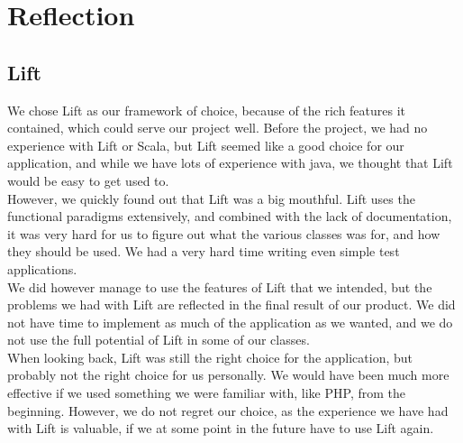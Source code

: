\section{Reflection}
\label{sec:reflection}

\subsection{Lift}
We chose Lift as our framework of choice, because of the rich features it contained, which could serve our project well. Before the project, we had no experience with Lift or Scala, but Lift seemed like a good choice for our application, and while we have lots of experience with java, we thought that Lift would be easy to get used to.\\
However, we quickly found out that Lift was a big mouthful. Lift uses the functional paradigms extensively, and combined with the lack of documentation, it was very hard for us to figure out what the various classes was for, and how they should be used. We had a very hard time writing even simple test applications.\\
We did however manage to use the features of Lift that we intended, but the problems we had with Lift are reflected in the final result of our product. We did not have time to implement as much of the application as we wanted, and we do not use the full potential of Lift in some of our classes. \\

When looking back, Lift was still the right choice for the application, but probably not the right choice for us personally. We would have been much more effective if we used something we were familiar with, like PHP, from the beginning. However, we do not regret our choice, as the experience we have had with Lift is valuable, if we at some point in the future have to use Lift again.

